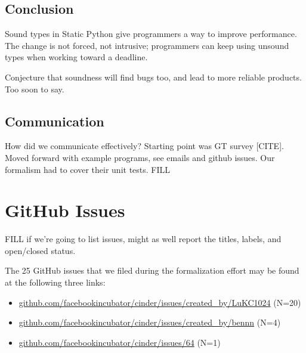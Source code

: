 \documentclass[english,cleveref,submission]{programming}
\newcommand{\shorturl}[2]{\href{#1#2}{#2}}
\begin{document}
\subsection{Conclusion}

Sound types in Static Python give programmers a way to improve performance.
The change is not forced, not intrusive;
programmers can keep using unsound types when working toward a deadline.

Conjecture that soundness will find bugs too, and lead to more reliable products.
Too soon to say.


\subsection{Communication}

How did we communicate effectively?
Starting point was GT survey [CITE].
Moved forward with example programs, see emails and github issues.
Our formalism had to cover their unit tests.
FILL



{\sloppy
\printbibliography
}

\appendix

\section{GitHub Issues}
\label{a:github-issues}

FILL if we're going to list issues, might as well report the titles, labels, and open/closed status.

The 25 GitHub issues that we filed during the formalization effort may be found at the following three links:

\begin{itemize}
  \item \shorturl{https://}{github.com/facebookincubator/cinder/issues/created\_by/LuKC1024} (N=20)
  \item \shorturl{https://}{github.com/facebookincubator/cinder/issues/created\_by/bennn} (N=4)
  \item \shorturl{https://}{github.com/facebookincubator/cinder/issues/64} (N=1)
\end{itemize}
\end{document}
